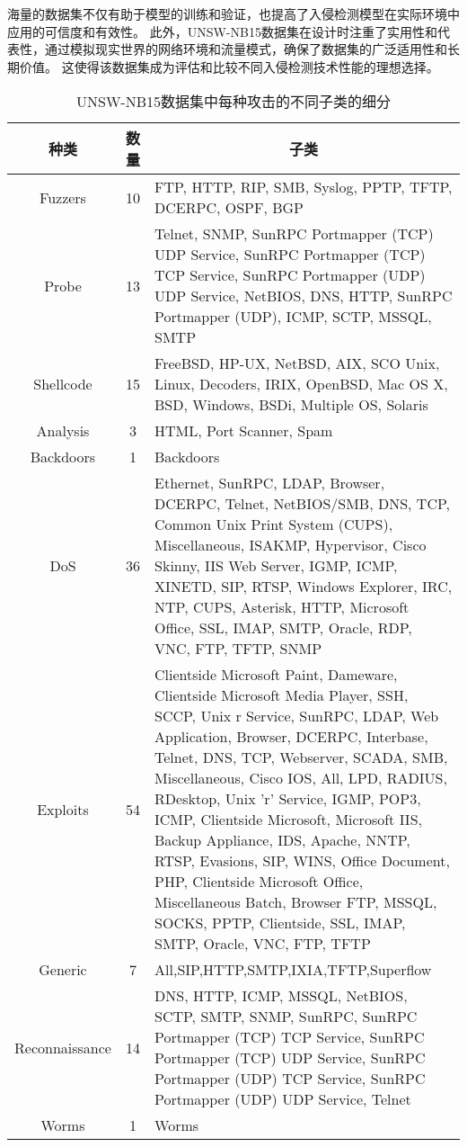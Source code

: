 海量的数据集不仅有助于模型的训练和验证，也提高了入侵检测模型在实际环境中应用的可信度和有效性。
此外，UNSW-NB15数据集在设计时注重了实用性和代表性，通过模拟现实世界的网络环境和流量模式，确保了数据集的广泛适用性和长期价值。
这使得该数据集成为评估和比较不同入侵检测技术性能的理想选择。
\begin{table}[htbp]
  \caption{UNSW-NB15数据集中每种攻击的不同子类的细分}
  \label{tab:UNSW-NB15_class}
  \begin{tabularx}{\textwidth}{@{}ccX@{}}
  \toprule
    \multicolumn{1}{c}{\textbf{种类}} & \multicolumn{1}{c}{\textbf{数量}} & \multicolumn{1}{c}{\textbf{子类}}\\
  \midrule
    Fuzzers & 10 & FTP, HTTP, RIP, SMB, Syslog, PPTP, TFTP, DCERPC, OSPF, BGP\\
    Probe & 13 & Telnet, SNMP, SunRPC Portmapper (TCP) UDP Service, SunRPC Portmapper (TCP) TCP Service, SunRPC Portmapper (UDP) UDP Service, NetBIOS, DNS, HTTP,
    SunRPC Portmapper (UDP), ICMP, SCTP, MSSQL, SMTP\\
    Shellcode & 15 & FreeBSD, HP-UX, NetBSD, AIX, SCO Unix, Linux, Decoders, IRIX, OpenBSD, Mac OS X, BSD, Windows, BSDi, Multiple OS, Solaris\\
    Analysis & 3 & HTML, Port Scanner, Spam\\
    Backdoors & 1 & Backdoors\\
    DoS & 36 & Ethernet, SunRPC, LDAP, Browser, DCERPC, Telnet, NetBIOS/SMB, DNS, TCP, Common Unix Print System (CUPS), Miscellaneous, ISAKMP, Hypervisor, 
    Cisco Skinny, IIS Web Server, IGMP, ICMP, XINETD, SIP, RTSP, Windows Explorer, IRC, NTP, CUPS, Asterisk, HTTP, Microsoft Office, SSL, IMAP, SMTP, Oracle, RDP, VNC, FTP, TFTP, SNMP\\
    Exploits & 54 &Clientside Microsoft Paint, Dameware, Clientside Microsoft Media Player, SSH, SCCP, Unix r Service, SunRPC, LDAP, Web Application, Browser, DCERPC, Interbase, Telnet, DNS, TCP, Webserver, SCADA, SMB, Miscellaneous, Cisco IOS, All, LPD, RADIUS, RDesktop, Unix 'r' Service, IGMP, POP3, ICMP, Clientside Microsoft, Microsoft IIS, Backup Appliance, IDS, Apache, NNTP, RTSP, Evasions, SIP, WINS, Office Document, PHP, Clientside Microsoft Office, Miscellaneous Batch, Browser FTP, MSSQL, SOCKS, PPTP, Clientside, SSL, IMAP, SMTP, Oracle, VNC, FTP, TFTP\\
    Generic& 7 &All,SIP,HTTP,SMTP,IXIA,TFTP,Superflow\\
    Reconnaissance& 14 &DNS, HTTP, ICMP, MSSQL, NetBIOS, SCTP, SMTP, SNMP, SunRPC, SunRPC Portmapper (TCP) TCP Service, SunRPC Portmapper (TCP) UDP Service, SunRPC Portmapper (UDP) TCP Service, SunRPC Portmapper (UDP) UDP Service, Telnet\\
    Worms&1&Worms\\
    \bottomrule
  \end{tabularx}
\end{table}


